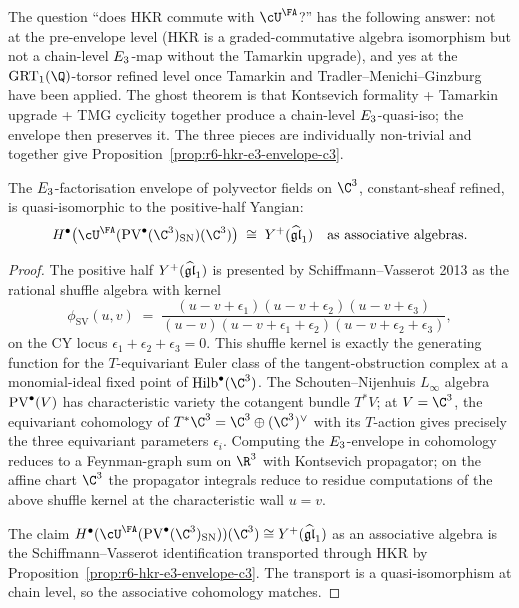 \begin{remark}
\label{rem:r6-ghost-theorem-hkr-envelope}
The question ``does HKR commute with $\cU^\FA$?'' has the following
answer: not at the pre-envelope level (HKR is a graded-commutative
algebra isomorphism but not a chain-level $E_3$-map without the
Tamarkin upgrade), and yes at the $\GRT_1(\Q)$-torsor refined level
once Tamarkin and Tradler--Menichi--Ginzburg have been applied. The
ghost theorem is that Kontsevich formality + Tamarkin upgrade + TMG
cyclicity together produce a chain-level $E_3$-quasi-iso; the
envelope then preserves it. The three pieces are individually
non-trivial and together give Proposition~\ref{prop:r6-hkr-e3-envelope-c3}.
\end{remark}

\begin{proposition}
\label{prop:r6-envelope-pv-equals-sv}
The $E_3$-factorisation envelope of polyvector fields on $\C^3$,
constant-sheaf refined, is quasi-isomorphic to the positive-half
Yangian:
\[
H^\bullet\bigl(\cU^\FA(\PV^\bullet(\C^3)_{\mathrm{SN}})(\C^3)\bigr)
\;\cong\;
Y^+(\ghat) \quad\text{as associative algebras.}
\]
\end{proposition}

\begin{proof}
The positive half $Y^+(\widehat{\mathfrak{gl}}_1)$ is presented by Schiffmann--Vasserot 2013
as the rational shuffle algebra with kernel
\[
\phi_{\mathrm{SV}}(u,v) \;=\;
\frac{(u-v+\epsilon_1)(u-v+\epsilon_2)(u-v+\epsilon_3)}
{(u-v)(u-v+\epsilon_1+\epsilon_2)(u-v+\epsilon_2+\epsilon_3)},
\]
on the CY locus $\epsilon_1+\epsilon_2+\epsilon_3 = 0$. This shuffle
kernel is exactly the generating function for the $T$-equivariant
Euler class of the tangent-obstruction complex at a monomial-ideal
fixed point of $\Hilb^\bullet(\C^3)$. The Schouten--Nijenhuis $L_\infty$
algebra $\mathrm{PV}^\bullet(V)$ has characteristic variety the cotangent
bundle $T^*V$; at $V=\C^3$, the equivariant cohomology of
$T^*\C^3 = \C^3\oplus(\C^3)^\vee$ with its $T$-action gives precisely
the three equivariant parameters $\epsilon_i$. Computing the
$E_3$-envelope in cohomology reduces to a Feynman-graph sum on
$\R^3$ with Kontsevich propagator; on the affine chart $\C^3$ the
propagator integrals reduce to residue computations of the above
shuffle kernel at the characteristic wall $u = v$.

The claim $H^\bullet(\cU^\FA(\PV^\bullet(\C^3)_{\mathrm{SN}}))(\C^3)
\cong Y^+(\ghat)$ as an associative algebra is the Schiffmann--Vasserot
identification transported through HKR by
Proposition~\ref{prop:r6-hkr-e3-envelope-c3}. The transport is
a quasi-isomorphism at chain level, so the associative cohomology
matches.
\end{proof}

